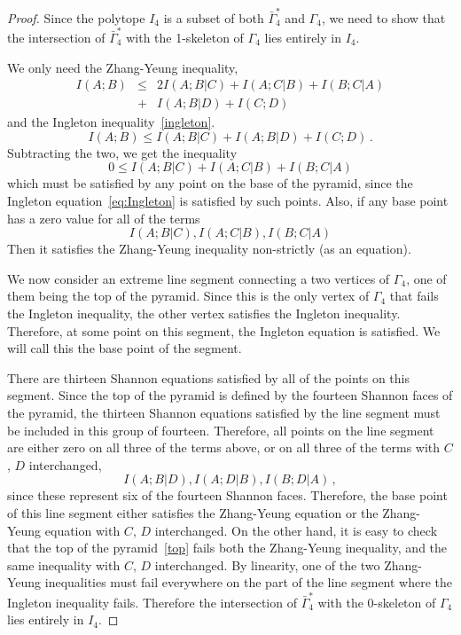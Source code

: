 \documentclass[10pt,journal]{IEEEtran}
\begin{document}
\begin{proof}
Since the polytope $I_4$ is a subset of both $\bar\Gamma^*_4$ and $\Gamma_4$,
we need to show that the intersection of $\bar\Gamma^*_4$ with the 1-skeleton of
$\Gamma_4$ lies entirely in $I_4$.

We only need the Zhang-Yeung inequality,
\begin{eqnarray*}
I(A;B) &\leq& 2I(A;B|C) + I(A;C|B) + I(B;C|A)\\
&+&I(A;B|D)+I(C;D)
\end{eqnarray*}
and the Ingleton inequality~\eqref{ingleton}.
\begin{equation}
I(A;B) \leq I(A;B|C)+I(A;B|D)+I(C;D) \, .
\end{equation}
Subtracting the two, we get the inequality
$$
0 \leq I(A;B|C) + I(A;C|B) +I(B;C|A)
$$
which must be satisfied by any point on the base of the pyramid, since the Ingleton equation~\eqref{eq:Ingleton}
is satisfied by such points.
Also, if any base point has a zero value for all of the terms
$$
I(A;B|C), I(A;C|B), I(B;C|A)
$$
Then it satisfies the Zhang-Yeung inequality non-strictly (as an equation).

We now consider an extreme line segment connecting
a two vertices of $\Gamma_4$, one of them being the top of the pyramid.  Since this
is the only vertex of $\Gamma_4$ that fails the Ingleton inequality, the other vertex satisfies the
Ingleton inequality.  Therefore, at some point on this segment, the Ingleton equation is satisfied.
We will call this the base point of the segment.

There are thirteen Shannon equations satisfied by all of the points on this segment.
Since the top of the pyramid is defined by the fourteen Shannon faces of the pyramid,
the thirteen Shannon equations satisfied by the line segment must be included in this group of fourteen.
Therefore, all points on the line segment are either zero on all three of the terms above, or on all three
of the terms with $C$, $D$ interchanged,
$$
I(A;B|D), I(A;D|B), I(B;D|A)\, ,
$$
since these represent six of the fourteen Shannon faces.  Therefore, the base point of this line segment
either satisfies the Zhang-Yeung equation
or the Zhang-Yeung equation with $C$, $D$ interchanged.
On the other hand, it is easy to check that the top of the pyramid~\eqref{top} fails both the Zhang-Yeung inequality,
and the same inequality with $C$, $D$ interchanged.
By linearity, one of the two Zhang-Yeung inequalities must fail everywhere on the
part of the line segment where the Ingleton inequality fails.
Therefore the intersection of $\bar\Gamma^*_4$ with the 0-skeleton of $\Gamma_4$ lies entirely in $I_4$.
\end{proof}
\end{document}

